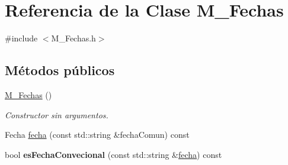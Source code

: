 \hypertarget{classM__Fechas}{\section{\-Referencia de la \-Clase \-M\-\_\-\-Fechas}
\label{classM__Fechas}
}


{\ttfamily \#include $<$\-M\-\_\-\-Fechas.\-h$>$}

\subsection*{\-Métodos públicos}
\begin{DoxyCompactItemize}
\item 
\hypertarget{classM__Fechas_a4e85392938b64b9e75860de17ce9e954}{\hyperlink{classM__Fechas_a4e85392938b64b9e75860de17ce9e954}{\-M\-\_\-\-Fechas} ()}\label{classM__Fechas_a4e85392938b64b9e75860de17ce9e954}

\begin{DoxyCompactList}\small\item\em \-Constructor sin argumentos. \end{DoxyCompactList}\item 
\-Fecha \hyperlink{classM__Fechas_a9ab0eddea3638aba66d48215c216d91e}{fecha} (const std\-::string \&fecha\-Comun) const 
\item 
\hypertarget{classM__Fechas_ac343493066e728100dfeb386d247d808}{bool {\bfseries es\-Fecha\-Convecional} (const std\-::string \&\hyperlink{classM__Fechas_a9ab0eddea3638aba66d48215c216d91e}{fecha}) const }\label{classM__Fechas_ac343493066e728100dfeb386d247d808}


\end{DoxyCompactItemize}
